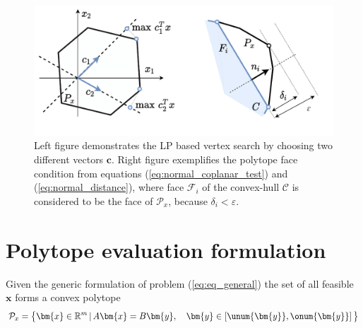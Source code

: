 \begin{figure}[!t]
    \centering
    \includegraphics[width=0.90\linewidth]{Papers/images/poly_lp_vert_sample.pdf}
    \vspace{-0.2cm}
    \caption{Left figure demonstrates the LP based vertex search by choosing two different vectors $\bm{c}$. Right figure exemplifies the polytope face condition from equations (\ref{eq:normal_coplanar_test}) and (\ref{eq:normal_distance}), where  face $\mathcal{F}_i$ of the convex-hull $\mathcal{C}$ is considered to be the face of $\mathcal{P}_x$, because $\delta_i\! < \!\varepsilon$.  }
    \label{fig:sample_problems}
\end{figure}

\section{Polytope evaluation formulation}
\label{ch:algorihtm}

Given the generic formulation of problem (\ref{eq:eq_general}) the set of all feasible $\bm{x}$ forms a convex polytope 
\begin{equation}
    \mathcal{P}_x = \big\{ \bm{x}\in \mathbb{R}^{m}\, |\,A\bm{x} = B\bm{y},\quad  \bm{y}\in \left[\unum{\bm{y}}, \onum{\bm{y}}\right]  \big\}
    \label{eq:poly_init_2}
\end{equation}


